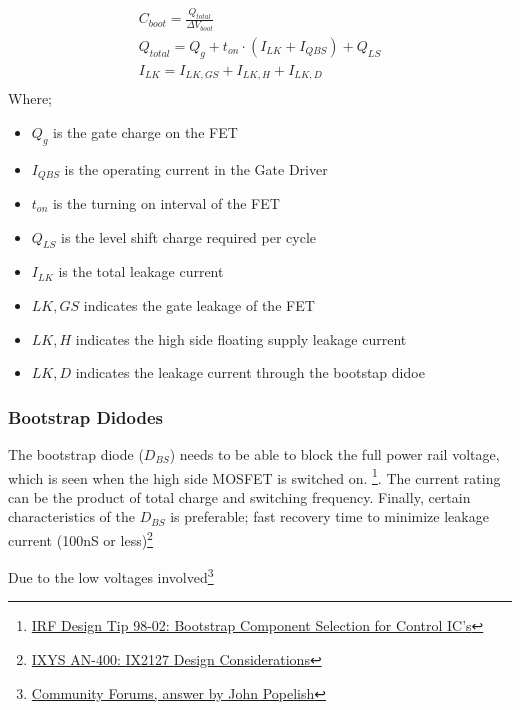     \begin{subequations}
    \begin{align}
    C_{boot} = \frac{Q_{total}}{\Delta V_{boot}}\\
    Q_{total} = Q_g + t_{on}\cdot(I_{LK} + I_{QBS}) + Q_{LS}\\
    I_{LK} = I_{LK,GS} + I_{LK,H} + I_{LK,D}\\
    \end{align}
    \end{subequations}
    Where;
        \begin{itemize}
        \item $Q_g$ is the gate charge on the FET
        \item $I_{QBS}$ is the operating current in the Gate Driver
        \item $t_{on}$ is the turning on interval of the FET
        \item $Q_{LS}$ is the level shift charge required per cycle
        \item $I_{LK}$ is the total leakage current
        \item $LK,GS$ indicates the gate leakage of the FET
        \item $LK,H$ indicates the high side floating supply leakage current
        \item $LK,D$ indicates the leakage current through the bootstap didoe
        \end{itemize}

\subsubsection{Bootstrap Didodes}
The bootstrap diode ($D_{BS}$) needs to be able to block the full power rail
voltage, which is seen when the high side MOSFET is switched
on. \footnote{\href{http://www.irf.com/technical-info/designtp/dt98-2.pdf}{IRF Design
Tip 98-02: Bootstrap Component Selection for Control IC's}}. The current rating
can be the product of total charge and switching frequency. Finally, certain
characteristics of the $D_{BS}$ is preferable; fast recovery time to minimize
leakage current (100nS or
less)\footnote{\href{http://www.ixysic.com/home/pdfs.nsf/www/AN-400.pdf/$file/AN-400.pdf}{IXYS
AN-400: IX2127 Design Considerations}}

Due to the low voltages
involved\footnote{\href{http://www.electronicspoint.com/threads/what-is-the-difference-between-schottky-and-fast-recovery-diode.97716/\#post-669477}{Community Forums, answer by John Popelish}}

